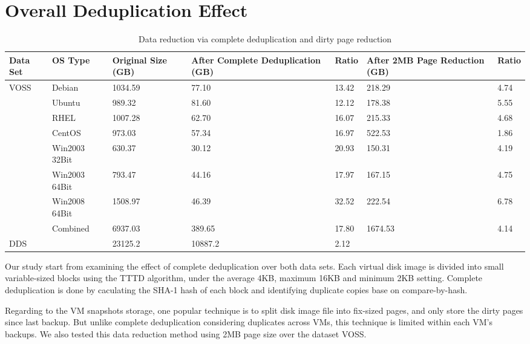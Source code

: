 \section{Overall Deduplication Effect}
\label{sect:dedup}

\begin{table*}[tbh]
  \centering
    \begin{tabular}{|l|l|p{0.8in}|p{1.1in}|p{0.3in}|p{0.9in}|p{0.3in}|}
        \hline
        Data Set & OS Type & Original Size \newline (GB) & After Complete \newline Deduplication (GB) & Ratio & After 2MB Page \newline Reduction (GB) & Ratio \\ \hline
        \multirow{8}{*}{VOSS} & Debian & 1034.59 & 77.10 & 13.42 & 218.29 & 4.74 \\ \cline{2-7}
         & Ubuntu & 989.32 & 81.60 & 12.12 & 178.38 & 5.55 \\ \cline{2-7}
         & RHEL & 1007.28 & 62.70 & 16.07 & 215.33 & 4.68 \\ \cline{2-7}
         & CentOS & 973.03 & 57.34 & 16.97 & 522.53 & 1.86 \\ \cline{2-7}
         & Win2003 32Bit & 630.37 & 30.12 & 20.93 & 150.31 & 4.19 \\ \cline{2-7}
         & Win2003 64Bit & 793.47 & 44.16 & 17.97 & 167.15 & 4.75 \\ \cline{2-7}
         & Win2008 64Bit & 1508.97 & 46.39 & 32.52 & 222.54 & 6.78 \\ \cline{2-7}
         & Combined & 6937.03 & 389.65 & 17.80 & 1674.53 & 4.14 \\ \hline
        DDS & ~ & 23125.2 & 10887.2 & 2.12 & ~ & ~ \\
        \hline
    \end{tabular}
    \caption{Data reduction via complete deduplication and dirty page reduction}
    \label{tab:dedup}
\end{table*}

Our study start from examining the effect of complete deduplication over both data sets.
Each virtual disk image is divided into small variable-sized blocks using the TTTD algorithm\cite{frame05},
under the average 4KB, maximum 16KB and minimum 2KB setting. Complete deduplication is
done by caculating the SHA-1 hash of each block and identifying duplicate copies base on compare-by-hash.

Regarding to the VM snapshots storage, one popular technique is to split disk image file into fix-sized
pages, and only store the dirty pages since last backup. But unlike complete deduplication considering duplicates
across VMs, this technique is limited within each VM's backups. We also tested this data reduction method
using 2MB page size over the dataset VOSS. 

